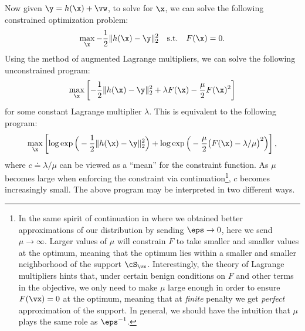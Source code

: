 \documentclass[../../book-main.tex]{subfiles}
\begin{document}
Now given $\y = h(\x) +\vw$, to solve for $\x$, we can solve the following constrained optimization problem:
\begin{equation}
    \max_{\x} - \frac{1}{2}\|h(\x) - \y\|_2^2 \quad \mbox{s.t.} \quad F(\x) = {0}. 
\end{equation}
Using the method of augmented Lagrange multipliers, we can solve the following unconstrained program:
\begin{equation}
   \max_{\x} \left[-\frac{1}{2}\|h(\x) - \y\|_2^2  + \lambda F(\x) - \frac{\mu}{2} F(\x)^2\right]
\end{equation}
for some constant Lagrange multiplier $\lambda$.
This is equivalent to the following program:
\begin{equation}\label{eq:lagrange_multiplier_continuation}
\max_{\x} \left[\log \exp\Big(- \frac{1}{2}\|h(\x) - \y\|_2^2\Big) + \log \exp\Big( - \frac{\mu}{2} \big(F(\x) - \lambda/\mu\big)^2\Big)\right],
\end{equation} 
where $c \doteq {\lambda}/{\mu}$ can be viewed as a ``mean''  for the constraint function. As $\mu$ becomes large when enforcing the constraint via continuation\footnote{In the same spirit of continuation in  where we obtained better approximations of our distribution by sending \(\eps \to 0\), here we send \(\mu \to \infty\). Larger values of \(\mu\) will constrain \(F\) to take smaller and smaller values at the optimum, meaning that the optimum lies within a smaller and smaller neighborhood of the support \(\cS_{\vx}\). Interestingly, the theory of Lagrange multipliers hints that, under certain benign conditions on \(F\) and other terms in the objective, we only need to make \(\mu\) large enough in order to ensure \(F(\vx) = 0\) at the optimum, meaning that at \textit{finite} penalty we get \textit{perfect} approximation of the support. In general, we should have the intuition that \(\mu\) plays the same role as \(\eps^{-1}\).}, $c$ becomes increasingly small. The above program may be interpreted in two different ways. 
\end{document}
